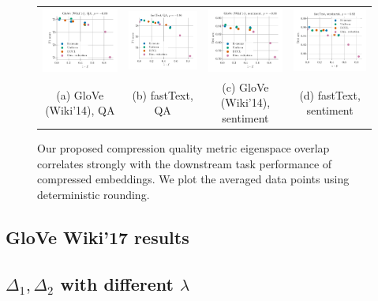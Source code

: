 \begin{figure}
	\footnotesize
	\begin{tabular}{@{\hskip -0.0in}c@{\hskip -0.0in}c@{\hskip -0.0in}c@{\hskip -0.0in}c@{\hskip -0.0in}}
		\includegraphics[width=.245\linewidth]{figures/glove400k_qa_best-f1_vs_subspace-dist-normalized_linx_det_ave-pt.pdf} &
		\includegraphics[width=.245\linewidth]{figures/fasttext1m_qa_best-f1_vs_subspace-dist-normalized_linx_det_ave-pt.pdf} &
		\includegraphics[width=.245\linewidth]{figures/glove400k_sentiment_sst_test-acc_vs_subspace-dist-normalized_linx_det_ave-pt.pdf} &
		\includegraphics[width=.245\linewidth]{figures/fasttext1m_sentiment_sst_test-acc_vs_subspace-dist-normalized_linx_det_ave-pt.pdf}	\\
		(a) GloVe (Wiki'14), QA & \;\;\;\;(b) fastText, QA  & \;\;\;\;\;\;(c) GloVe (Wiki'14), sentiment & \;\;\;\;\;(d) fastText, sentiment 
	\end{tabular}
	\caption{Our proposed compression quality metric eigenspace overlap correlates strongly with the downstream task performance of compressed embeddings. We plot the averaged data points using deterministic rounding.}
	\label{fig:good_correlation_det_ave_pt}
\end{figure}

\subsection{GloVe Wiki'17 results}
\label{subsec:glove_wiki17}

\subsection{$\Delta_1, \Delta_2$ with different $\lambda$}
\label{subsec:diff_lambdas}



